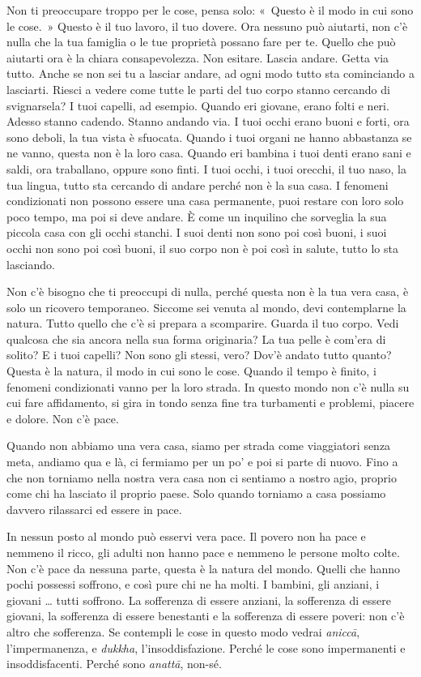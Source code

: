Non ti preoccupare troppo per le cose, pensa solo: «~Questo è il modo in
cui sono le cose.~» Questo è il tuo lavoro, il tuo dovere. Ora nessuno
può aiutarti, non c'è nulla che la tua famiglia o le tue proprietà
possano fare per te. Quello che può aiutarti ora è la chiara
consapevolezza. Non esitare. Lascia andare. Getta via tutto. Anche se
non sei tu a lasciar andare, ad ogni modo tutto sta cominciando a
lasciarti. Riesci a vedere come tutte le parti del tuo corpo stanno
cercando di svignarsela? I tuoi capelli, ad esempio. Quando eri giovane,
erano folti e neri. Adesso stanno cadendo. Stanno andando via. I tuoi
occhi erano buoni e forti, ora sono deboli, la tua vista è sfuocata.
Quando i tuoi organi ne hanno abbastanza se ne vanno, questa non è la
loro casa. Quando eri bambina i tuoi denti erano sani e saldi, ora
traballano, oppure sono finti. I tuoi occhi, i tuoi orecchi, il tuo
naso, la tua lingua, tutto sta cercando di andare perché non è la sua
casa. I fenomeni condizionati non possono essere una casa permanente,
puoi restare con loro solo poco tempo, ma poi si deve andare. È come un
inquilino che sorveglia la sua piccola casa con gli occhi stanchi. I
suoi denti non sono poi così buoni, i suoi occhi non sono poi così
buoni, il suo corpo non è poi così in salute, tutto lo sta lasciando.

Non c'è bisogno che ti preoccupi di nulla, perché questa non è la tua
vera casa, è solo un ricovero temporaneo. Siccome sei venuta al mondo,
devi contemplarne la natura. Tutto quello che c'è si prepara a
scomparire. Guarda il tuo corpo. Vedi qualcosa che sia ancora nella sua
forma originaria? La tua pelle è com'era di solito? E i tuoi capelli?
Non sono gli stessi, vero? Dov'è andato tutto quanto? Questa è la
natura, il modo in cui sono le cose. Quando il tempo è finito, i
fenomeni condizionati vanno per la loro strada. In questo mondo non c'è
nulla su cui fare affidamento, si gira in tondo senza fine tra
turbamenti e problemi, piacere e dolore. Non c'è pace.

Quando non abbiamo una vera casa, siamo per strada come viaggiatori
senza meta, andiamo qua e là, ci fermiamo per un po' e poi si parte di
nuovo. Fino a che non torniamo nella nostra vera casa non ci sentiamo a
nostro agio, proprio come chi ha lasciato il proprio paese. Solo quando
torniamo a casa possiamo davvero rilassarci ed essere in pace.

In nessun posto al mondo può esservi vera pace. Il povero non ha pace e
nemmeno il ricco, gli adulti non hanno pace e nemmeno le persone molto
colte. Non c'è pace da nessuna parte, questa è la natura del mondo.
Quelli che hanno pochi possessi soffrono, e così pure chi ne ha molti. I
bambini, gli anziani, i giovani \ldots{} tutti soffrono. La sofferenza di
essere anziani, la sofferenza di essere giovani, la sofferenza di essere
benestanti e la sofferenza di essere poveri: non c'è altro che
sofferenza. Se contempli le cose in questo modo vedrai \emph{aniccā},
l'impermanenza, e \emph{dukkha}, l'insoddisfazione. Perché le cose sono
impermanenti e insoddisfacenti. Perché sono \emph{anattā}, non-sé.

